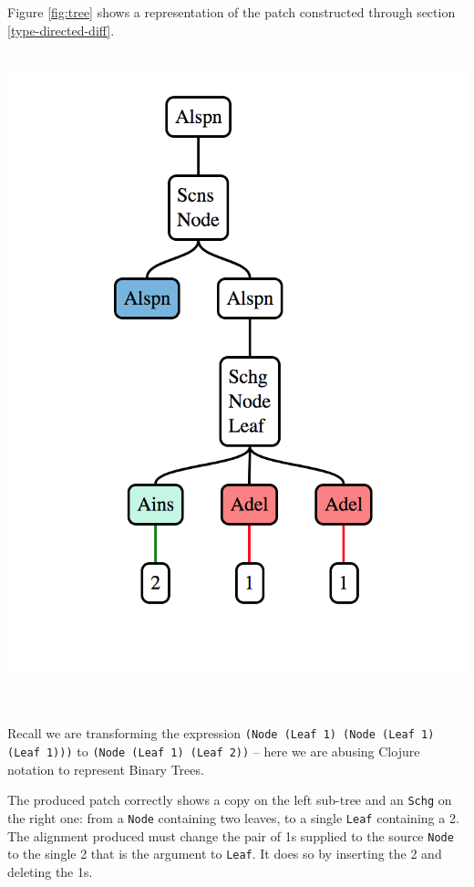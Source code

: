 \documentclass[11pt, titlepage]{article}
\newcommand{\toHaskell}[1]{\texttt{#1}\xspace}
\newcommand{\toClojure}[1]{\texttt{#1}\xspace}
\newcommand{\schg}{\toHaskell{Schg}}
\begin{document}
Figure \ref{fig:tree} shows a representation of the patch constructed through section \ref{type-directed-diff}. 
\\
\\
\begin{minipage}{\linewidth}
\centering
\includegraphics[scale=0.5]{tree.png}
\label{fig:tree}  
\end{minipage}
\\
\\
Recall we are transforming the expression \toClojure{(Node (Leaf 1) (Node (Leaf 1) (Leaf 1)))} to \toClojure{(Node (Leaf 1) (Leaf 2))} -- here we are abusing Clojure notation to represent Binary Trees.

The produced patch correctly shows a copy on the left sub-tree and an \schg on the right one: from a \toClojure{Node} containing two leaves, to a single \toClojure{Leaf} containing a 2. The alignment produced must change the pair of 1s supplied to the source \toClojure{Node} to the single 2 that is the argument to \toClojure{Leaf}. It does so by inserting the 2 and deleting the 1s.
\end{document}
